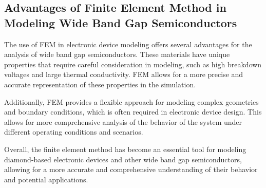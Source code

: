 \subsection{Advantages of Finite Element Method in Modeling Wide Band Gap Semiconductors}

The use of FEM in electronic device modeling offers several advantages for the analysis of wide band gap semiconductors. These materials have unique properties that require careful consideration in modeling, such as high breakdown voltages and large thermal conductivity. FEM allows for a more precise and accurate representation of these properties in the simulation.

Additionally, FEM provides a flexible approach for modeling complex geometries and boundary conditions, which is often required in electronic device design. This allows for more comprehensive analysis of the behavior of the system under different operating conditions and scenarios.

Overall, the finite element method has become an essential tool for modeling diamond-based electronic devices and other wide band gap semiconductors, allowing for a more accurate and comprehensive understanding of their behavior and potential applications.

